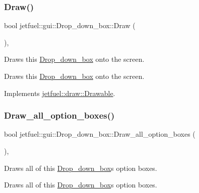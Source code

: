 \subsubsection{\texorpdfstring{Draw()}{Draw()}}
{\footnotesize\ttfamily bool jetfuel\+::gui\+::\+Drop\+\_\+down\+\_\+box\+::\+Draw (\begin{DoxyParamCaption}{ }\end{DoxyParamCaption})\hspace{0.3cm}{\ttfamily [override]}, {\ttfamily [virtual]}}



Draws this \hyperlink{classjetfuel_1_1gui_1_1Drop__down__box}{Drop\+\_\+down\+\_\+box} onto the screen. 

Draws this \hyperlink{classjetfuel_1_1gui_1_1Drop__down__box}{Drop\+\_\+down\+\_\+box} onto the screen. 

Implements \hyperlink{classjetfuel_1_1draw_1_1Drawable_a1a072070322965ce9411ee6e7c311c56}{jetfuel\+::draw\+::\+Drawable}.

\mbox{\label{classjetfuel_1_1gui_1_1Drop__down__box_ae29b89b98fa3211ead2fffc712ce264f}} 
\subsubsection{\texorpdfstring{Draw\+\_\+all\+\_\+option\+\_\+boxes()}{Draw\_all\_option\_boxes()}}
{\footnotesize\ttfamily bool jetfuel\+::gui\+::\+Drop\+\_\+down\+\_\+box\+::\+Draw\+\_\+all\+\_\+option\+\_\+boxes (\begin{DoxyParamCaption}{ }\end{DoxyParamCaption})\hspace{0.3cm}{\ttfamily [inline]}, {\ttfamily [protected]}}



Draws all of this \hyperlink{classjetfuel_1_1gui_1_1Drop__down__box}{Drop\+\_\+down\+\_\+box}\textquotesingle{}s option boxes. 

Draws all of this \hyperlink{classjetfuel_1_1gui_1_1Drop__down__box}{Drop\+\_\+down\+\_\+box}\textquotesingle{}s option boxes. \mbox{\label{classjetfuel_1_1gui_1_1Drop__down__box_a7bc0f38e40897db13797e4937a50c334}} 
